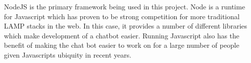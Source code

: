 NodeJS is the primary framework being used in this project.  Node is a runtime
for Javascript which has proven to be strong competition for more traditional
LAMP stacks in the web.  In this case, it provides a number of different
libraries which make development of a chatbot easier.  Running Javascript also
has the benefit of making the chat bot easier to work on for a large number of
people given Javascripts ubiquity in recent years.

